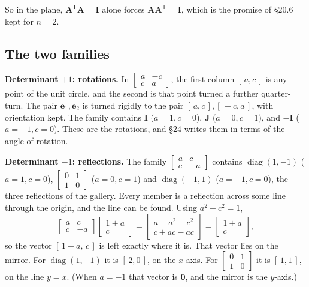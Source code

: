 \documentclass[11pt]{article}
\theoremstyle{plain}
\theoremstyle{definition}
\theoremstyle{remark}
\newcommand{\vc}[1]{\mathbf{#1}}
\newcommand{\mt}[1]{\mathbf{#1}}
\newcommand{\T}{^{\mathsf{T}}}
\DeclareMathOperator{\diagop}{diag}
\begin{document}
\noindent So in the plane, $\mt{A}\T\mt{A}=\mt{I}$ alone forces
$\mt{A}\mt{A}\T=\mt{I}$, which is the promise of \S20.6 kept for $n=2$.

\subsection{The two families}
\textbf{Determinant $+1$: rotations.} In $\begin{bmatrix}a&-c\\c&a\end{bmatrix}$,
the first column $[\,a,c\,]$ is any point of the unit circle, and the second is
that point turned a further quarter-turn. The pair $\vc{e}_1,\vc{e}_2$ is turned
rigidly to the pair $[\,a,c\,],[\,-c,a\,]$, with orientation kept. The family
contains $\mt{I}$ ($a=1,c=0$), $\mt{J}$ ($a=0,c=1$), and $-\mt{I}$
($a=-1,c=0$). These are the rotations, and \S24 writes them in terms of the angle
of rotation.

\textbf{Determinant $-1$: reflections.} The family
$\begin{bmatrix}a&c\\c&-a\end{bmatrix}$ contains $\diagop(1,-1)$
($a=1,c=0$), $\begin{bmatrix}0&1\\1&0\end{bmatrix}$ ($a=0,c=1$) and
$\diagop(-1,1)$ ($a=-1,c=0$), the three reflections of the gallery. Every
member is a reflection across some line through the origin, and the line can be
found. Using $a^{2}+c^{2}=1$,
\[
  \begin{bmatrix}a&c\\c&-a\end{bmatrix}\begin{bmatrix}1+a\\c\end{bmatrix}
  =\begin{bmatrix}a+a^{2}+c^{2}\\c+ac-ac\end{bmatrix}
  =\begin{bmatrix}1+a\\c\end{bmatrix},
\]
so the vector $[\,1+a,\,c\,]$ is left exactly where it is. That vector lies on
the mirror. For $\diagop(1,-1)$ it is $[\,2,0\,]$, on the $x$-axis. For
$\begin{bmatrix}0&1\\1&0\end{bmatrix}$ it is $[\,1,1\,]$, on the line $y=x$.
(When $a=-1$ that vector is $\vc{0}$, and the mirror is the $y$-axis.)
\end{document}
